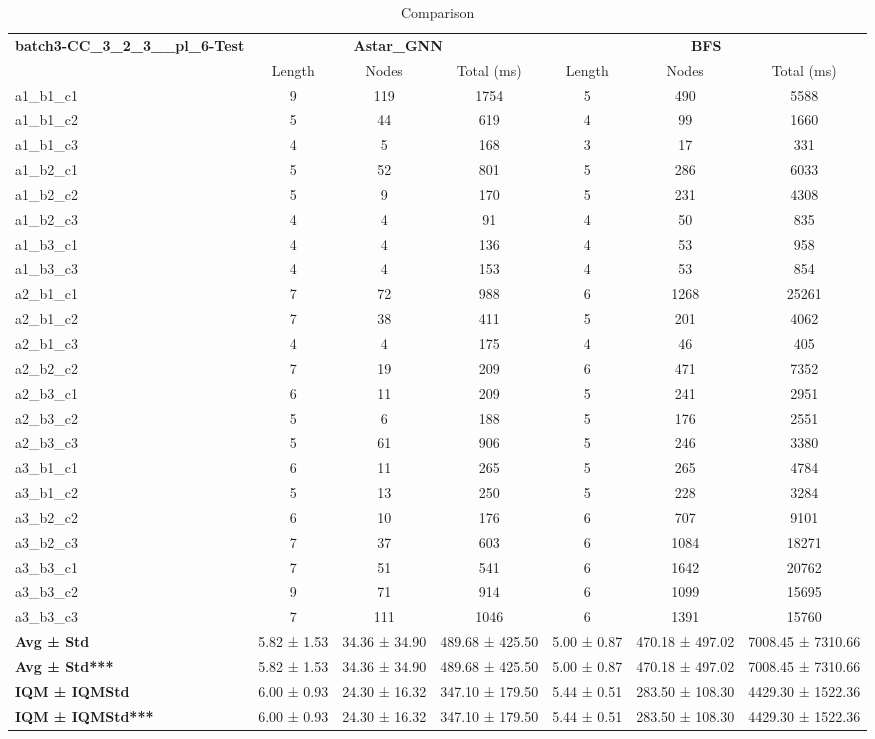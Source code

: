 \begin{table}[!ht]
\centering
\small
\begin{tabular}{l|ccc|ccc}
\multirow{2}{*}{\textbf{batch3-CC\_3\_2\_3\_\_pl\_6-Test}} & \multicolumn{3}{c|}{\textbf{Astar\_GNN}} & \multicolumn{3}{c}{\textbf{BFS}} \\
\cline{2-7}
& Length & Nodes & Total (ms) & Length & Nodes & Total (ms) \\
\hline
a1\_b1\_c1 & 9 & 119 & 1754 & 5 & 490 & 5588 \\
a1\_b1\_c2 & 5 & 44 & 619 & 4 & 99 & 1660 \\
a1\_b1\_c3 & 4 & 5 & 168 & 3 & 17 & 331 \\
a1\_b2\_c1 & 5 & 52 & 801 & 5 & 286 & 6033 \\
a1\_b2\_c2 & 5 & 9 & 170 & 5 & 231 & 4308 \\
a1\_b2\_c3 & 4 & 4 & 91 & 4 & 50 & 835 \\
a1\_b3\_c1 & 4 & 4 & 136 & 4 & 53 & 958 \\
a1\_b3\_c3 & 4 & 4 & 153 & 4 & 53 & 854 \\
a2\_b1\_c1 & 7 & 72 & 988 & 6 & 1268 & 25261 \\
a2\_b1\_c2 & 7 & 38 & 411 & 5 & 201 & 4062 \\
a2\_b1\_c3 & 4 & 4 & 175 & 4 & 46 & 405 \\
a2\_b2\_c2 & 7 & 19 & 209 & 6 & 471 & 7352 \\
a2\_b3\_c1 & 6 & 11 & 209 & 5 & 241 & 2951 \\
a2\_b3\_c2 & 5 & 6 & 188 & 5 & 176 & 2551 \\
a2\_b3\_c3 & 5 & 61 & 906 & 5 & 246 & 3380 \\
a3\_b1\_c1 & 6 & 11 & 265 & 5 & 265 & 4784 \\
a3\_b1\_c2 & 5 & 13 & 250 & 5 & 228 & 3284 \\
a3\_b2\_c2 & 6 & 10 & 176 & 6 & 707 & 9101 \\
a3\_b2\_c3 & 7 & 37 & 603 & 6 & 1084 & 18271 \\
a3\_b3\_c1 & 7 & 51 & 541 & 6 & 1642 & 20762 \\
a3\_b3\_c2 & 9 & 71 & 914 & 6 & 1099 & 15695 \\
a3\_b3\_c3 & 7 & 111 & 1046 & 6 & 1391 & 15760 \\
\hline
\textbf{Avg ± Std} & 5.82 ± 1.53 & 34.36 ± 34.90 & 489.68 ± 425.50 & 5.00 ± 0.87 & 470.18 ± 497.02 & 7008.45 ± 7310.66 \\
\textbf{Avg ± Std***} & 5.82 ± 1.53 & 34.36 ± 34.90 & 489.68 ± 425.50 & 5.00 ± 0.87 & 470.18 ± 497.02 & 7008.45 ± 7310.66 \\
\textbf{IQM ± IQMStd} & 6.00 ± 0.93 & 24.30 ± 16.32 & 347.10 ± 179.50 & 5.44 ± 0.51 & 283.50 ± 108.30 & 4429.30 ± 1522.36 \\
\textbf{IQM ± IQMStd***} & 6.00 ± 0.93 & 24.30 ± 16.32 & 347.10 ± 179.50 & 5.44 ± 0.51 & 283.50 ± 108.30 & 4429.30 ± 1522.36 \\
\end{tabular}
\caption{Comparison}
\label{tab:batch3_CC_3_2_3__pl_6_comparison_test}
\end{table}
